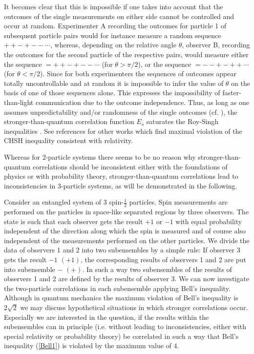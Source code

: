 It becomes clear that this is
impossible if one takes into account that the
outcomes of the single measurements on either side cannot be controlled
and occur at random.
Experimenter A recording the outcomes for particle 1 of subsequent
particle
pairs would for instance measure a random sequence
$++-+-- \cdots$,
whereas, depending on the relative angle $\theta$,
observer B, recording the outcomes for the second particle of the
respective
pairs, would measure
either the sequence
$=++-+-- \cdots$
(for $\theta > \pi/2$),
or the sequence
$=--+-++ \cdots$
(for $\theta < \pi/2$).
Since for both experimenters the sequences of outcomes
appear totally uncontrollable and at random
it is impossible to infer the value of $\theta$ on the basis of one of
those sequences alone. This expresses the impossibility of
faster-than-light communication due to the
outcome independence.
Thus, as long as one assumes
unpredictability and/or randomness of the single outcomes
(cf. \cite{pop-rohr}),
the stronger-than-quantum correlation function $E_s$ saturates
the Roy-Singh inequalities \cite{roy-singh}.
See references \cite{khalfin-85,rastall-85,summers-87} for other works
which find
maximal violation of the CHSH inequality consistent with relativity.

Whereas for 2-particle systems there seems to be no reason why
stronger-than-quantum  correlations should be inconsistent either with the
foundations of physics or with probability theory, stronger-than-quantum
correlations lead to inconsistencies in 3-particle systems, as will be
demonstrated in the following.

Consider an entangled system of 3 spin-$\frac{1}{2}$ particles.
Spin measurements are performed on the particles in space-like separated
regions by three observers. The state is such that each observer gets the
result $+1$ or $-1$ with equal probability independent of the direction
along which the spin is measured and of course also independent of the measurements %
performed on the other particles.
We divide the data of observers 1 and 2 into two subensembles
by a simple rule:
If observer 3 gets the result $-1$ $(+1)$, the corresponding results of
observers 1 and 2 are put into subensemble $-$ $(+)$.
In such a way two subensembles of the results of observers 1
and 2 are defined by the results of observer 3.
We can now investigate the two-particle correlations in each subensemble
applying Bell's inequality.
Although in quantum mechanics the maximum violation of Bell's inequality is $2\sqrt{2}$ %
\cite{cirelson:80,cirelson} we may discuss hypothetical situations in which stronger %
correlations occur. Especially we are interested in the question, if the results within the %
subensembles can in principle (i.e. without leading to inconsistencies, either with special %
relativity or probability theory) be correlated in such a way that Bell's inequality %
(\ref{Bell1}) is violated by the maximum value of 4.

